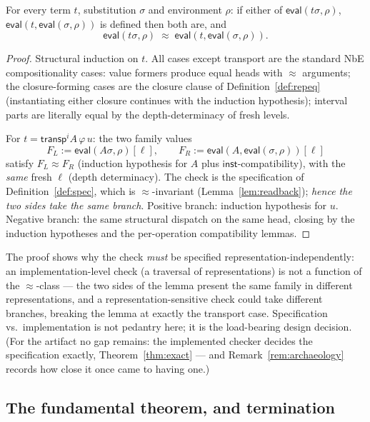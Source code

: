 \documentclass{lmcs}
\newcommand{\transp}{\mathsf{transp}}
\newcommand{\repeq}{\approx}
\newcommand{\evalop}{\mathsf{eval}}
\newcommand{\capp}{\mathsf{inst}}
\begin{document}
\begin{lem}\label{lem:subst}
  For every term $t$, substitution $\sigma$ and environment $\rho$:
  if either of $\evalop(t\sigma, \rho)$,
  $\evalop(t, \evalop(\sigma, \rho))$ is defined then both are, and
  \[
    \evalop(t\sigma, \rho) \;\repeq\; \evalop(t, \evalop(\sigma, \rho)).
  \]
\end{lem}
\begin{proof}
  Structural induction on $t$.  All cases except transport are the
  standard NbE compositionality cases: value formers produce equal
  heads with $\repeq$ arguments; the closure-forming cases are the
  closure clause of Definition~\ref{def:repeq} (instantiating either
  closure continues with the induction hypothesis); interval parts
  are literally equal by the depth-determinacy of fresh levels.

  For $t = \transp^i A\,\varphi\,u$: the two family values
  \[
    F_L := \evalop(A\sigma,\rho)[\ell], \qquad
    F_R := \evalop(A, \evalop(\sigma,\rho))[\ell]
  \]
  satisfy $F_L \repeq F_R$ (induction hypothesis for $A$ plus
  $\capp$-compatibility), with the \emph{same} fresh $\ell$ (depth
  determinacy).  The check is the specification of
  Definition~\ref{def:spec}, which is $\repeq$-invariant
  (Lemma~\ref{lem:readback}); \emph{hence the two sides take the same
  branch}.  Positive branch: induction hypothesis for $u$.  Negative
  branch: the same structural dispatch on the same head, closing by
  the induction hypotheses and the per-operation compatibility
  lemmas.
\end{proof}

\begin{rem}\label{rem:whyspec}
  The proof shows why the check \emph{must} be specified
  representation-independently: an implementation-level check
  (a traversal of representations) is not a function of the
  $\repeq$-class --- the two sides of the lemma present the same
  family in different representations, and a
  representation-sensitive check could take different branches,
  breaking the lemma at exactly the transport case.  Specification
  vs.\ implementation is not pedantry here; it is the load-bearing
  design decision.  (For the artifact no gap remains: the implemented
  checker decides the specification exactly, Theorem~\ref{thm:exact}
  --- and Remark~\ref{rem:archaeology} records how close it once came
  to having one.)
\end{rem}

\subsection{The fundamental theorem, and termination}
\end{document}
